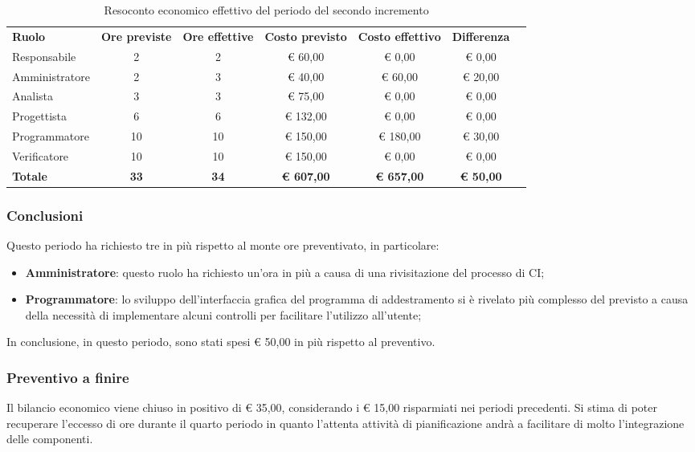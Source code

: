 \documentclass[../piano-di-progetto.tex]{subfiles}
\begin{document}
  \begin{table}[H]
    \centering
    \begin{tabular}{lcccccc}
      \rowcolor{lightgray}
      \textbf{Ruolo}  & \textbf{Ore previste} & \textbf{Ore effettive} & \textbf{Costo previsto} & \textbf{Costo effettivo} & \textbf{Differenza} \\
Responsabile    & 2           & 2           & € 60,00           & € 0,00            & € 0,00           \\
Amministratore  & 2           & 3           & € 40,00           & € 60,00           & € 20,00          \\
Analista        & 3           & 3           & € 75,00           & € 0,00            & € 0,00           \\
Progettista     & 6           & 6           & € 132,00          & € 0,00            & € 0,00           \\
Programmatore   & 10          & 10          & € 150,00          & € 180,00          & € 30,00          \\
Verificatore    & 10          & 10          & € 150,00          & € 0,00            & € 0,00           \\
\textbf{Totale} & \textbf{33} & \textbf{34} & \textbf{€ 607,00} & \textbf{€ 657,00} & \textbf{€ 50,00}

    \end{tabular}
    \caption{Resoconto economico effettivo del periodo del secondo incremento}
  \end{table}


\subsubsection{Conclusioni}
Questo periodo ha richiesto tre in più rispetto al monte ore preventivato, in particolare:
\begin{itemize}
    \item \textbf{Amministratore}: questo ruolo ha richiesto un'ora in più a causa di una rivisitazione del processo di CI;
    \item \textbf{Programmatore}: lo sviluppo dell'interfaccia grafica del programma di addestramento si è rivelato più complesso del previsto a causa della necessità di implementare alcuni controlli per facilitare l'utilizzo all'utente;
\end{itemize}
In conclusione, in questo periodo, sono stati spesi € 50,00 in più rispetto al preventivo.

\subsubsection{Preventivo a finire}
Il bilancio economico viene chiuso in positivo di € 35,00, considerando i € 15,00 risparmiati nei periodi precedenti. Si stima di poter recuperare l'eccesso di ore durante il quarto periodo in quanto l'attenta attività di pianificazione andrà a facilitare di molto l'integrazione delle componenti. 
\end{document}
